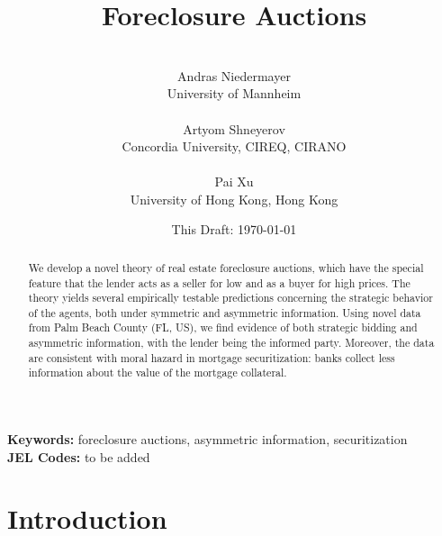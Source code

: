 \documentclass[11pt,twopage]{article}
\begin{document}
\title{Foreclosure Auctions} \author{
  \\
  Andras Niedermayer\\
  {University of Mannheim}\\
  \\
  Artyom Shneyerov\\
  {Concordia University, CIREQ, CIRANO}\\ \\
  Pai Xu\\
  {University of Hong Kong, Hong Kong} }

\date{This Draft: \today}

\thispagestyle{empty}
\maketitle

\begin{abstract}
  We develop a novel theory of real estate foreclosure auctions, which
  have the special feature that the lender acts as a seller for low
  and as a buyer for high prices. The theory yields several
  empirically testable predictions concerning the strategic behavior
  of the agents, both under symmetric and asymmetric
  information. Using novel data from Palm Beach County (FL, US), we
  find evidence of both strategic bidding and asymmetric information,
  with the lender being the informed party. Moreover, the data are
  consistent with moral hazard in mortgage securitization:
  banks collect less information about the value
  of the mortgage collateral.
\end{abstract}

\setlength{\baselineskip}{1.5\baselineskip}

\noindent \textbf{Keywords: } foreclosure auctions, asymmetric information, securitization \\
\textbf{JEL Codes: } to be added


\section{Introduction}
\end{document}
